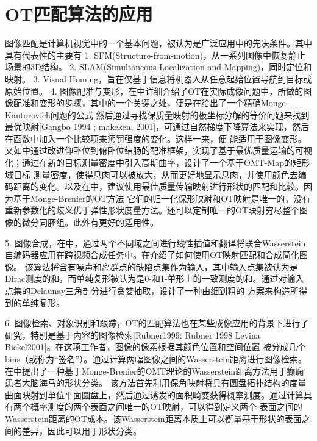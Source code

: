 
\section{OT匹配算法的应用}

图像匹配是计算机视觉中的一个基本问题，被认为是广泛应用中的先决条件。其中具有代表性的主要有
1. SFM(Structure-from-motion)，从一系列图像中恢复静止场景的3D结构。
2. SLAM(Simultaneous Localization and Mapping)，同时定位和映射。
3. Visual Homing，旨在仅基于信息将机器人从任意起始位置导航到目标或原始位置。
4. 图像配准与变形，在\cite{haker2004optimal}中详细介绍了OT在实际成像问题中，所做的图像配准和变形的步骤，其中的一个关键之处，便是在给出了一个精确Monge-Kantorovich问题的公式
然后通过寻找保质量映射的极坐标分解的等价问题来找到最优映射[Gangbo 1994 ; makeken, 2001]，可通过自然梯度下降算法来实现，然后在函数中加入一个比较项来惩罚强度的变化。这样一来，便
能适用于图像变形。又如\cite{ma2019supine}中通过改进仰卧位到俯卧位结肠的配准框架，实现了基于最优质量运输的可视化；通过在新的目标测量密度中引入高斯曲率，设计了一个基于OMT-Map的矩形域目标
测量密度，使得息肉可以被放大，从而更好地显示息肉，并使用颜色去编码距离的变化。以及在\cite{su2015optimal}中，建议使用最佳质量传输映射进行形状的匹配和比较。因为基于Monge-Brenier的OT方法
它们的归一化保形映射和OT映射是唯一的，没有重新参数化的歧义优于弹性形状度量方法。还可以定制唯一的OT映射穷尽整个图像的微分同胚组。此外有更好的适用性。

5. 图像合成，在\cite{RN1}中，通过两个不同域之间进行线性插值和翻译将联合Wasserstein自编码器应用在跨视频合成任务中。在\cite{de2011optimal}介绍了如何使用OT映射匹配和合成简化图像。
该算法将含有噪声和离群点的缺陷点集作为输入，其中输入点集被认为是Dirac测度的和，而单纯复形被认为是0-和1-单形上的一致测度的和。通过对输入点集的Delaunay三角剖分进行贪婪抽取，设计了一种由细到粗的
方案来构造所得到的单纯复形。

6. 图像检索、对象识别和跟踪，OT的匹配算法也在某些成像应用的背景下进行了研究，特别是基于内容的图像检索[Rubner1999; Rubner 1998 Levina Bickel2001]。在这项工作者，图像的像素根据其颜色位置和空间位置
被分成几个bins（或称为“签名”）。通过计算两幅图像之间的Wasserstein距离进行图像检索。在\cite{ma2015surface}中提出了一种基于Monge-Brenier的OMT理论的Wasserstein距离方法用于癫痫患者大脑海马的形状分类。
该方法首先利用保角映射将具有圆盘拓扑结构的度量曲面映射到单位平面圆盘上，然后通过诱发的面积畸变获得概率测度。通过计算具有两个概率测度的两个表面之间唯一的OT映射，可以得到定义两个
表面之间的Wasserstein距离的OT成本。该Wasserstein距离本质上可以衡量基于形状的表面之间的差异，因此可以用于形状分类。